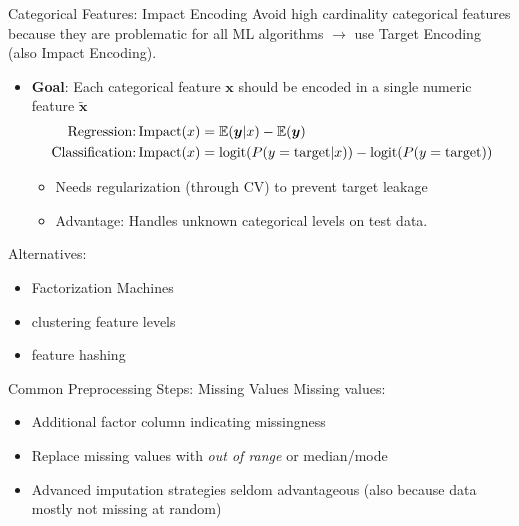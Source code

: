 \begin{frame}{Categorical Features: Impact Encoding}
  Avoid high cardinality categorical features because they are problematic for all ML algorithms $\rightarrow$ use Target Encoding (also Impact Encoding).
  \begin{itemize}
    \item \textbf{Goal}: Each categorical feature $\bm{x}$ should be encoded in a single numeric feature $\tilde{\bm{x}}$ \\
    \vspace*{-0.5cm}  
    \begin{align*}
    \text{Regression:} \operatorname{Impact}(x) &= \operatorname*{\mathbb{E}}(\bm{y} | x) - \operatorname*{\mathbb{E}}(\bm{y}) \\
    \text{Classification:} \operatorname{Impact}(x) &= \operatorname{logit}(P( y = \text{target} | x)) - \operatorname{logit}(P( y = \text{target}))
    \end{align*}
    \vspace*{-0.5cm}  
    \begin{itemize}
      \item Needs regularization (through CV) to prevent target leakage 
      \item Advantage: Handles unknown categorical levels on test data.
    \end{itemize}
  \end{itemize}

  Alternatives:
  \begin{itemize}
    \item Factorization Machines
    \item clustering feature levels
    \item feature hashing
  \end{itemize}
\end{frame}

\begin{frame}{Common Preprocessing Steps: Missing Values}
  Missing values:
  \begin{itemize}
    \item Additional factor column indicating missingness
    \item Replace missing values with \emph{out of range} or median/mode
    \item Advanced imputation strategies seldom advantageous (also because data mostly not missing at random)
  \end{itemize}
\end{frame}

